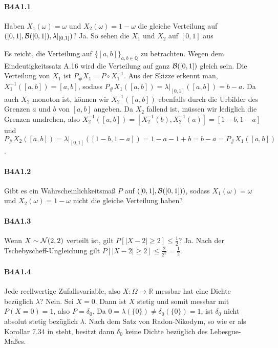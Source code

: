 \documentclass{article}
\begin{document}
\paragraph{B4A1.1}
Haben $X_1(\omega)=\omega$ und $X_2(\omega)=1-\omega$ die gleiche Verteilung auf $([0,1],{\cal B}([0,1]),\lambda|_{[0,1]})$?
Ja.
So sehen die $X_1$ und $X_2$ auf $[0,1]$ aus
\begin{center}
\end{center}
Es reicht, die Verteilung auf $\{[a,b]\}_{a,b\in\mathbb{Q}}$ zu betrachten.
Wegen dem Eindeutigkeitssatz A.16 wird die Verteilung auf ganz ${\cal B}([0,1])$ gleich sein.
Die Verteilung von $X_1$ ist $P_\#X_1=P\circ X_1^{-1}$.
Aus der Skizze erkennt man, $X_1^{-1}([a,b])=[a,b]$, sodass $P_\#X_1([a,b])=\lambda|_{[0,1]}([a,b])=b-a$.
Da auch $X_2$ monoton ist, können wir $X_2^{-1}([a,b])$ ebenfalls durch die Urbilder des Grenzen $a$ und $b$ von $[a,b]$ angeben.
Da $X_2$ fallend ist, müssen wir lediglich die Grenzen umdrehen, also $X_2^{-1}([a,b])=[X_2^{-1}(b),X_2^{-1}(a)]=[1-b,1-a]$ und $P_\#X_2([a,b])=\lambda|_{[0,1]}([1-b,1-a])=1-a-1+b=b-a=P_\#X_1([a,b])$.
\paragraph{B4A1.2}
Gibt es ein Wahrscheinlichkeitsmaß $P$ auf $([0,1],{\cal B}([0,1]))$, sodass $X_1(\omega)=\omega$ und $X_2(\omega)=1-\omega$ nicht die gleiche Verteilung haben?
\paragraph{B4A1.3}
Wenn $X\sim{\cal N}(2,2)$ verteilt ist, gilt $P[|X-2|\geq2]\leq\frac{1}{2}$?
Ja.
Nach der Tschebyscheff-Ungleichung gilt $P[|X-2|\geq2]\leq\frac{2}{2^2}=\frac{1}{2}$.
\paragraph{B4A1.4}
Jede reellwertige Zufallsvariable, also $X\colon \Omega\to\mathbb{R}$ messbar hat eine Dichte bezüglich $\lambda$?
Nein.
Sei $X=0$.
Dann ist $X$ stetig und somit messbar mit $P(X=0)=1$, also $P=\delta_0$.
Da $0=\lambda(\{0\})\neq\delta_0(\{0\})=1$, ist $\delta_0$ nicht absolut stetig bezüglich $\lambda$.
Nach dem Satz von Radon-Nikodym, so wie er als Korollar 7.34 in \cite{klenke} steht, besitzt dann $\delta_0$ keine Dichte bezüglich des Lebesgue-Maßes.
\end{document}
